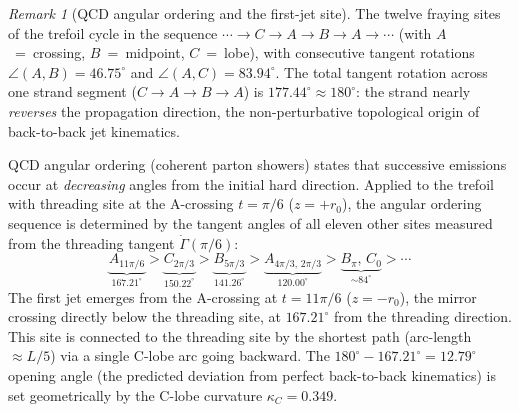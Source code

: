 \documentclass[11pt,a4paper]{article}
\theoremstyle{definition}\newtheorem{definition}[theorem]{Definition}
\theoremstyle{remark}
\newtheorem{remark}[theorem]{Remark}
\newcommand{\tang}{\dot\Gamma}
\begin{document}
\begin{remark}[QCD angular ordering and the first-jet site]
\label{P19:rem:angular_ordering}
The twelve fraying sites of the trefoil cycle in the sequence
$\cdots\to C\to A\to B\to A\to\cdots$ (with $A$~=~crossing,
$B$~=~midpoint, $C$~=~lobe), with consecutive tangent rotations
$\angle(A,B)=46.75^\circ$ and $\angle(A,C)=83.94^\circ$.
The total tangent rotation across one strand segment
($C\to A\to B\to A$) is $177.44^\circ\approx180^\circ$: the strand
nearly \emph{reverses} the propagation direction, the non-perturbative
topological origin of back-to-back jet kinematics.

QCD angular ordering (coherent parton showers) states that successive
emissions occur at \emph{decreasing} angles from the initial hard
direction.  Applied to the trefoil with threading site at the
A-crossing $t=\pi/6$ ($z=+r_0$), the angular ordering sequence is
determined by the tangent angles of all eleven other sites measured
from the threading tangent $\tang(\pi/6)$:
\begin{equation}
\underbrace{A_{11\pi/6}}_{167.21^\circ}
>\underbrace{C_{2\pi/3}}_{150.22^\circ}
>\underbrace{B_{5\pi/3}}_{141.26^\circ}
>\underbrace{A_{4\pi/3,\,2\pi/3}}_{120.00^\circ}
>\underbrace{B_{\pi},\,C_0}_{{\sim}84^\circ}
>\cdots
\label{P19:eq:angular_ordering_sequence}
\end{equation}
The first jet emerges from the A-crossing at $t=11\pi/6$
($z=-r_0$), the mirror crossing directly below the threading site,
at $\mathbf{167.21^\circ}$ from the threading direction.  This site
is connected to the threading site by the shortest path (arc-length
$\approx L/5$) via a single C-lobe arc going backward.
The $180^\circ-167.21^\circ=\mathbf{12.79^\circ}$ opening angle
(the predicted deviation from perfect back-to-back kinematics) is
set geometrically by the C-lobe curvature $\kappa_C=0.349$.


\end{remark}
\end{document}
